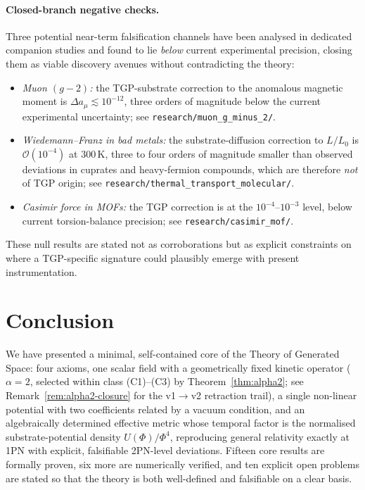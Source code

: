 \documentclass[11pt,a4paper]{article}
\renewcommand{\Phi}{\varPhi}
\begin{document}
\paragraph{Closed-branch negative checks.} Three potential near-term
falsification channels have been analysed in dedicated companion
studies and found to lie \emph{below} current experimental precision,
closing them as viable discovery avenues without contradicting the
theory:
\begin{itemize}[nosep]
  \item \emph{Muon $(g\!-\!2)$:} the TGP-substrate correction to the
    anomalous magnetic moment is $\Delta a_{\mu}\lesssim 10^{-12}$,
    three orders of magnitude below the current experimental
    uncertainty; see \texttt{research/muon\_g\_minus\_2/}.
  \item \emph{Wiedemann--Franz in bad metals:} the substrate-diffusion
    correction to $L/L_{0}$ is $\mathcal{O}(10^{-4})$ at $300$\,K, three
    to four orders of magnitude smaller than observed deviations in
    cuprates and heavy-fermion compounds, which are therefore \emph{not}
    of TGP origin; see \texttt{research/thermal\_transport\_molecular/}.
  \item \emph{Casimir force in MOFs:} the TGP correction is at the
    $10^{-4}$--$10^{-3}$ level, below current torsion-balance precision;
    see \texttt{research/casimir\_mof/}.
\end{itemize}
These null results are stated not as corroborations but as explicit
constraints on where a TGP-specific signature could plausibly emerge
with present instrumentation.

\section{Conclusion}\label{sec:conclusion}

We have presented a minimal, self-contained core of the Theory of Generated
Space: four axioms, one scalar field with a geometrically fixed kinetic
operator ($\alpha=2$, selected within class (C1)--(C3) by
Theorem~\ref{thm:alpha2}; see Remark~\ref{rem:alpha2-closure} for the
v1$\to$v2 retraction trail), a single non-linear potential with two
coefficients related by a vacuum condition, and an algebraically determined effective
metric whose temporal factor is the normalised substrate-potential density
$U(\Phi)/\Phi^{4}$, reproducing general relativity exactly at 1PN with
explicit, falsifiable 2PN-level deviations. Fifteen core results are
formally proven, six more are numerically verified, and ten explicit open
problems are stated so that the theory is both well-defined and falsifiable
on a clear basis.
\end{document}
